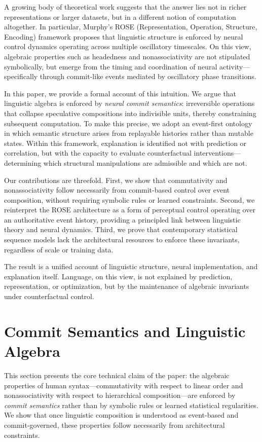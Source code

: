 \documentclass[11pt]{article}
\begin{document}
A growing body of theoretical work suggests that the answer lies not in richer representations or larger datasets, but in a different notion of computation altogether. In particular, Murphy’s ROSE (Representation, Operation, Structure, Encoding) framework proposes that linguistic structure is enforced by neural control dynamics operating across multiple oscillatory timescales. On this view, algebraic properties such as headedness and nonassociativity are not stipulated symbolically, but emerge from the timing and coordination of neural activity—specifically through commit-like events mediated by oscillatory phase transitions.

In this paper, we provide a formal account of this intuition. We argue that linguistic algebra is enforced by \emph{neural commit semantics}: irreversible operations that collapse speculative compositions into indivisible units, thereby constraining subsequent computation. To make this precise, we adopt an event-first ontology in which semantic structure arises from replayable histories rather than mutable states. Within this framework, explanation is identified not with prediction or correlation, but with the capacity to evaluate counterfactual interventions—determining which structural manipulations are admissible and which are not.

Our contributions are threefold. First, we show that commutativity and nonassociativity follow necessarily from commit-based control over event composition, without requiring symbolic rules or learned constraints. Second, we reinterpret the ROSE architecture as a form of perceptual control operating over an authoritative event history, providing a principled link between linguistic theory and neural dynamics. Third, we prove that contemporary statistical sequence models lack the architectural resources to enforce these invariants, regardless of scale or training data.

The result is a unified account of linguistic structure, neural implementation, and explanation itself. Language, on this view, is not explained by prediction, representation, or optimization, but by the maintenance of algebraic invariants under counterfactual control.

\section{Commit Semantics and Linguistic Algebra}
\label{sec:commit_algebra}

This section presents the core technical claim of the paper: the algebraic properties of human syntax—commutativity with respect to linear order and nonassociativity with respect to hierarchical composition—are enforced by \emph{commit semantics} rather than by symbolic rules or learned statistical regularities. We show that once linguistic composition is understood as event-based and commit-governed, these properties follow necessarily from architectural constraints.
\end{document}
